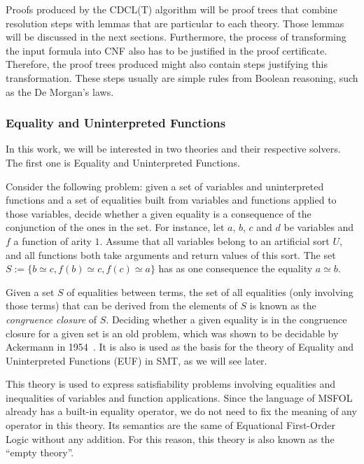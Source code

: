 Proofs produced by the CDCL(T) algorithm will be proof trees that combine resolution steps with lemmas that are particular to each theory.
Those lemmas will be discussed in the next sections. Furthermore, the process of transforming the input formula into CNF also has to be
justified in the proof certificate. Therefore, the proof trees produced might also contain steps justifying this transformation. These
steps usually are simple rules from Boolean reasoning, such as the De Morgan's laws.

\subsubsection{Equality and Uninterpreted Functions}\label{sec:euf}

In this work, we will be interested in two theories and their respective solvers. The first one is Equality and Uninterpreted Functions.

Consider the following problem: given a set of variables and uninterpreted functions and a set of equalities built from variables and functions applied to those variables, decide whether a given equality is a consequence of the conjunction of the ones in the set. For instance, let $a$, $b$, $c$ and $d$ be variables and $f$ a function of arity $1$. Assume that all variables belong to an artificial sort $U$, and all functions both take arguments and return values of this sort. The set $S := \{b \simeq c, f(b) \simeq c, f(c) \simeq a\}$ has as one consequence the equality $a \simeq b$.

Given a set $S$ of equalities between terms, the set of all equalities (only involving those terms) that can be
derived from the elements of $S$ is known as the \textit{congruence closure} of $S$.
%
Deciding whether a given equality is in the congruence closure for a given set is an old problem, which was shown to be decidable by Ackermann in 1954~\cite{ack_cong}. It is also is used as the basis for the theory of Equality and Uninterpreted Functions (EUF) in SMT, as we will see later.

This theory is used to express satisfiability problems involving equalities
and inequalities of variables and function applications. Since the language of
MSFOL already has a built-in equality operator, we do not need to fix the meaning
of any operator in this theory. Its semantics are the same of Equational First-Order
Logic without any addition. For this reason, this theory is also known as the
``empty theory''.


